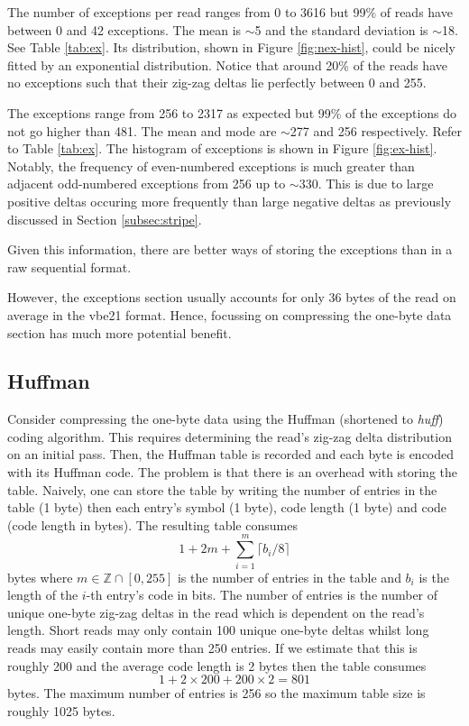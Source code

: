 The number of exceptions per read ranges from 0 to 3616 but 99\% of reads have
between 0 and 42 exceptions. The mean is $\sim$5 and the standard deviation is
$\sim$18. See Table \ref{tab:ex}. Its distribution, shown in Figure
\ref{fig:nex-hist}, could be nicely fitted by an exponential distribution.
Notice that around 20\% of the reads have no exceptions such that their zig-zag
deltas lie perfectly between 0 and 255.




The exceptions range from 256 to 2317 as expected but 99\% of the exceptions do
not go higher than 481. The mean and mode are $\sim$277 and 256 respectively.
Refer to Table \ref{tab:ex}. The histogram of exceptions is shown in Figure
\ref{fig:ex-hist}. Notably, the frequency of even-numbered exceptions is much
greater than adjacent odd-numbered exceptions from 256 up to $\sim$330. This is
due to large positive deltas occuring more frequently than large negative deltas
as previously discussed in Section \ref{subsec:stripe}.



Given this information, there are better ways of storing the exceptions than in
a raw sequential format.


However, the exceptions section usually accounts for only 36 bytes of the read
on average in the vbe21 format. Hence, focussing on compressing the one-byte
data section has much more potential benefit.

\subsection{Huffman}

Consider compressing the one-byte data using the Huffman (shortened to
\textit{huff}) coding algorithm. This requires determining the read's zig-zag
delta distribution on an initial pass. Then, the Huffman table is recorded and
each byte is encoded with its Huffman code. The problem is that there is an
overhead with storing the table.  Naively, one can store the table by writing
the number of entries in the table (1 byte) then each entry's symbol (1 byte),
code length (1 byte) and code (code length in bytes). The resulting table
consumes
\[ 1 + 2m + \sum_{i=1}^m\lceil b_i / 8 \rceil \]
bytes where $m\in\mathbb{Z}\cap[0,255]$ is the number of entries in the table
and $b_i$ is the length of the $i$-th entry's code in bits. The number of
entries is the number of unique one-byte zig-zag deltas in the read which is
dependent on the read's length. Short reads may only contain 100 unique one-byte
deltas whilst long reads may easily contain more than 250 entries. If we
estimate that this is roughly 200 and the average code length is 2 bytes then
the table consumes
\[ 1 + 2\times 200 + 200\times 2 = 801 \]
bytes. The maximum number of entries is 256 so the maximum table size is roughly
1025 bytes.

